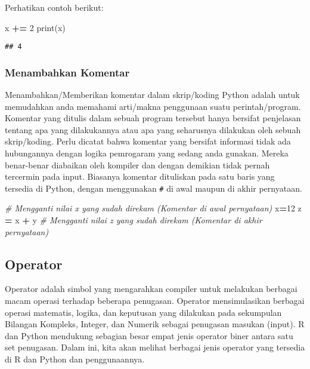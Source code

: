 \documentclass[
]{docs}
\newenvironment{Shaded}{\begin{snugshade}}{\end{snugshade}}
\newcommand{\BuiltInTok}[1]{#1}
\newcommand{\CommentTok}[1]{\textcolor[rgb]{0.56,0.35,0.01}{\textit{#1}}}
\newcommand{\DecValTok}[1]{\textcolor[rgb]{0.00,0.00,0.81}{#1}}
\newcommand{\NormalTok}[1]{#1}
\newcommand{\OperatorTok}[1]{\textcolor[rgb]{0.81,0.36,0.00}{\textbf{#1}}}
\begin{document}
Perhatikan contoh berikut:

\begin{Shaded}
\begin{Highlighting}[]
\NormalTok{x }\OperatorTok{+=} \DecValTok{2}
\BuiltInTok{print}\NormalTok{(x)}
\end{Highlighting}
\end{Shaded}

\begin{verbatim}
## 4
\end{verbatim}

\hypertarget{menambahkan-komentar}{%
\subsubsection{Menambahkan Komentar}\label{menambahkan-komentar}}

Menambahkan/Memberikan komentar dalam skrip/koding Python adalah untuk memudahkan anda memahami arti/makna penggunaan suatu perintah/program. Komentar yang ditulis dalam sebuah program tersebut hanya bersifat penjelasan tentang apa yang dilakukannya atau apa yang seharusnya dilakukan oleh sebuah skrip/koding. Perlu dicatat bahwa komentar yang bersifat informasi tidak ada hubungannya dengan logika pemrogaram yang sedang anda gunakan. Mereka benar-benar diabaikan oleh kompiler dan dengan demikian tidak pernah tercermin pada input. Biasanya komentar dituliskan pada satu baris yang tersedia di Python, dengan menggunakan \texttt{\#} di awal maupun di akhir pernyataan.

\begin{Shaded}
\begin{Highlighting}[]
\CommentTok{\# Mengganti nilai x yang sudah direkam (Komentar di awal pernyataan) }
\NormalTok{x}\OperatorTok{=}\DecValTok{12} 
\NormalTok{z }\OperatorTok{=}\NormalTok{ x }\OperatorTok{+}\NormalTok{ y   }\CommentTok{\# Mengganti nilai z yang sudah direkam (Komentar di akhir pernyataan) }
\end{Highlighting}
\end{Shaded}

\hypertarget{operator}{%
\subsection{Operator}\label{operator}}

Operator adalah simbol yang mengarahkan compiler untuk melakukan berbagai macam operasi terhadap beberapa penugasan. Operator mensimulasikan berbagai operasi matematis, logika, dan keputusan yang dilakukan pada sekumpulan Bilangan Kompleks, Integer, dan Numerik sebagai penugasan masukan (input). R dan Python mendukung sebagian besar empat jenis operator biner antara satu set penugasan. Dalam ini, kita akan melihat berbagai jenis operator yang tersedia di R dan Python dan penggunaannya.
\end{document}
